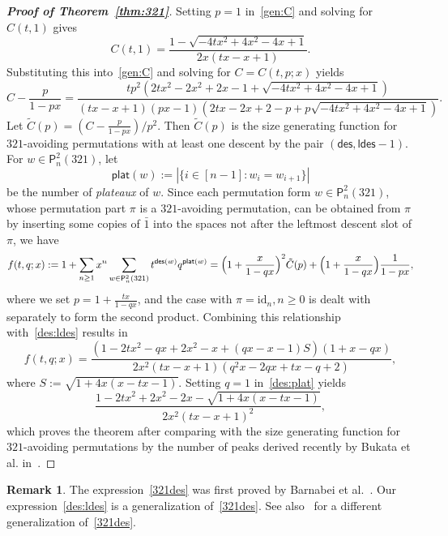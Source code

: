 \documentclass[12pt]{amsart}
\numberwithin{equation}{section}
\theoremstyle{plain}
\theoremstyle{definition}
\newtheorem{remark}[theorem]{Remark}
\renewcommand\P{\mathsf{P}}
\def\plat{\mathsf{plat}}
\def\id{\mathrm{id}}
\def\des{\mathsf{des}}
\def\ldes{\mathsf{ldes}}
\def\neg#1{{{{\bar#1}}}}
\begin{document}
\begin{proof}[{\bf Proof of Theorem~\ref{thm:321}}] Setting $p=1$ in~\eqref{gen:C} and solving for $C(t,1)$ gives 
\begin{equation}\label{321des}
C(t,1)=\frac{1-\sqrt{-4tx^2+4x^2-4x+1}}{2x(tx-x+1)}.
\end{equation}
Substituting this into~\eqref{gen:C} and solving for $C=C(t,p;x)$ yields 
\begin{equation}\label{des:ldes}
C-\frac{p}{1-px}=\frac{tp^2(2tx^2-2x^2+2x-1+\sqrt{-4tx^2+4x^2-4x+1})}{(tx-x+1)(px-1)(2tx-2x+2-p+p\sqrt{-4tx^2+4x^2-4x+1})}.
\end{equation}
Let $\tilde{C}(p)=(C-\frac{p}{1-px})/p^2$.
Then  $\tilde{C}(p)$ is the  size generating function for $321$-avoiding permutations with at least one descent by the pair $(\des,\ldes-1)$.
For  $w\in\P_n^2(321)$, let 
$$
\plat(w):=|\{i\in[n-1]:w_i=w_{i+1}\}|
$$
be the number of {\em plateaux} of $w$. 
 Since each permutation form $w\in\P_n^2(321)$, whose permutation part $\pi$ is a $321$-avoiding permutation, can be obtained from $\pi$ by inserting some copies of $\neg1$ into the spaces not after the leftmost descent slot of $\pi$, we have 
\begin{align*}
f(t,q;x):=1+\sum_{n\geq1}x^n\sum_{w\in\P_n^2(321)} t^{\des(w)}q^{\plat(w)}
	=\Bigl(1+\frac{x}{1-qx}\Bigr)^2\tilde{C}(p)+\Bigl(1+\frac{x}{1-qx}\Bigr)\frac{1}{1-px},
\end{align*}
where we set $p=1+\frac{tx}{1-qx}$, and the case with $\pi=\id_n, n\ge 0$ is dealt with separately to form the second product. Combining this relationship with~\eqref{des:ldes} results in 
\begin{equation}\label{des:plat}
f(t,q;x)=\frac{(1-2tx^2-qx+2x^2-x+(qx-x-1)S)(1+x-qx)}{2x^2(tx-x+1)(q^2x-2qx+tx-q+2)},
\end{equation}
where 
$S:=\sqrt{1+4x(x-tx-1)}$.
Setting $q=1$ in~\eqref{des:plat} yields
$$
\frac{1-2tx^2+2x^2-2x-\sqrt{1+4x(x-tx-1)}}{2x^2(tx-x+1)^2},
$$
which proves the theorem after comparing with the size generating function for $321$-avoiding permutations by the number of peaks derived recently by Bukata et al. in~\cite[Thm.~3]{pud}. 
\end{proof}
\begin{remark}
The expression~\eqref{321des} was first proved by Barnabei et al.~\cite{bbs}. Our expression~\eqref{des:ldes} is a generalization of~\eqref{321des}. See also~\cite{kl} for a different generalization of~\eqref{321des}.  
\end{remark}
\end{document}
